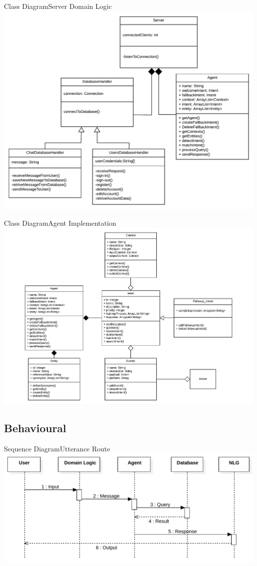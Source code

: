 \documentclass{beamer}
\begin{document}
\begin{frame}{Class Diagram}{Server Domain Logic}
    \includegraphics[width=.92\linewidth]{img3/ClassDiagramServerLogic.pdf}
\end{frame}

\begin{frame}{Class Diagram}{Agent Implementation}
    \centering\includegraphics[width=.96\linewidth]{img2/ClassDiagramAgent.pdf}
\end{frame}



\subsection{Behavioural}

\begin{frame}{Sequence Diagram}{Utterance Route}
    \includegraphics[width=\linewidth]{img3/SequenceDiagram2.pdf}
\end{frame}
\end{document}
